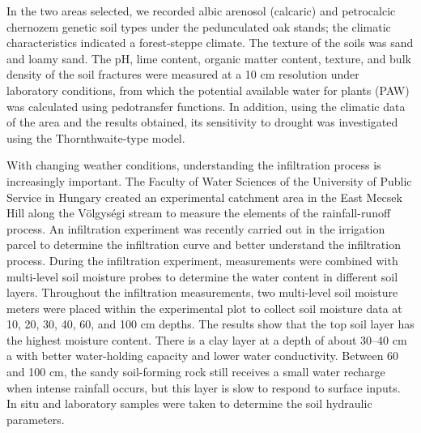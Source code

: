 In the two areas selected, we recorded albic arenosol (calcaric) and petrocalcic chernozem genetic soil types under the pedunculated oak stands; the climatic characteristics indicated a forest-steppe climate. The texture of the soils was sand and loamy sand. The pH, lime content, organic matter content, texture, and bulk density of the soil fractures were measured at a 10 cm resolution under laboratory conditions, from which the potential available water for plants (PAW) was calculated using pedotransfer functions. In addition, using the climatic data of the area and the results obtained, its sensitivity to drought was investigated using the Thornthwaite-type model.
\newpage{}
{}
\begin{flushleft}







\end{flushleft}

\noindent

With changing weather conditions, understanding the infiltration process is increasingly important. The Faculty of Water Sciences of the University of Public Service in Hungary created an experimental catchment area in the East Mecsek Hill along the Völgységi stream to measure the elements of the rainfall-runoff process. An infiltration experiment was recently carried out in the irrigation parcel to determine the infiltration curve and better understand the infiltration process. During the infiltration experiment, measurements were combined with multi-level soil moisture probes to determine the water content in different soil layers. Throughout the infiltration measurements, two multi-level soil moisture meters were placed within the experimental plot to collect soil moisture data at 10, 20, 30, 40, 60, and 100 cm depths. The results show that the top soil layer has the highest moisture content. There is a clay layer at a depth of about 30–40 cm a with better water-holding capacity and lower water conductivity. Between 60 and 100 cm, the sandy soil-forming rock still receives a small water recharge when intense rainfall occurs, but this layer is slow to respond to surface inputs. In situ and laboratory samples were taken to determine the soil hydraulic parameters.

